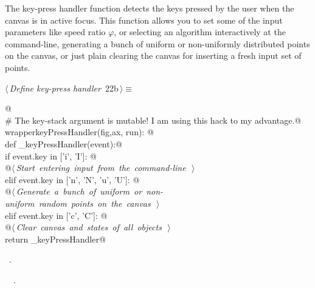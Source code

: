 \documentclass[11.5pt]{report}
\begin{document}
\vspace{-0.8cm}\newchunk The key-press handler function detects the keys pressed by the user when the canvas
is in active focus. This function allows you to set some of the input parameters like 
speed ratio $\varphi$, or selecting an algorithm interactively at the command-line, 
generating a bunch of uniform or non-uniformly distributed points on the canvas, 
or just plain clearing the canvas for inserting a fresh input set of points. 

\begin{flushleft} \small
\begin{minipage}{\linewidth}\label{scrap25}\raggedright\small
{} $\langle\,${\itshape Define key-press handler}\nobreak\ {\footnotesize {22b}}$\,\rangle\equiv$
\vspace{-1ex}
\begin{list}{}{} \item
\mbox{}\verb@   @\\
\mbox{}\verb@# The key-stack argument is mutable! I am using this hack to my advantage.@\\
\mbox{}\verb@def wrapperkeyPressHandler(fig,ax, run): @\\
\mbox{}\verb@       def _keyPressHandler(event):@\\
\mbox{}\verb@           if event.key in ['i', 'I']:  @\\
\mbox{}\verb@                @\hbox{$\langle\,${\itshape Start entering input from the command-line}\nobreak\ {\footnotesize {}}$\,\rangle$}\verb@@\\
\mbox{}\verb@           elif event.key in ['n', 'N', 'u', 'U']: @\\
\mbox{}\verb@                @\hbox{$\langle\,${\itshape Generate a bunch of uniform or non-uniform random points on the canvas}\nobreak\ {\footnotesize {}}$\,\rangle$}\verb@@\\
\mbox{}\verb@           elif event.key in ['c', 'C']: @\\
\mbox{}\verb@                @\hbox{$\langle\,${\itshape Clear canvas and states of all objects}\nobreak\ {\footnotesize {}}$\,\rangle$}\verb@@\\
\mbox{}\verb@       return _keyPressHandler@\\
\mbox{}\verb@@{\NWsep}
\end{list}
\vspace{-1.5ex}
\footnotesize
\begin{list}{}{\setlength{\itemsep}{-\parsep}\setlength{\itemindent}{-\leftmargin}}
\item \NWtxtMacroRefIn\ .
\item \NWtxtIdentsDefed\nobreak\  \verb@wrapperkeyPressHandler@\nobreak\ .
\item{}
\end{list}
\end{minipage}\vspace{4ex}
\end{flushleft}
\end{document}
